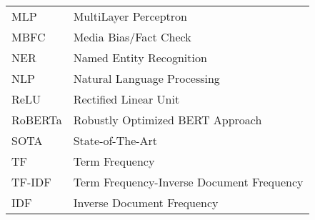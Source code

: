 \documentclass[master=mai,masteroption=slt]{kulemt}
\begin{document}
\begin{flushleft}
\begin{tabularx}{\textwidth}{@{}p{30mm}X@{}}
        MLP        & MultiLayer Perceptron                                                                       \\
        MBFC       & Media Bias/Fact Check                                                                       \\
        NER        & Named Entity Recognition                                                                    \\
        NLP        & Natural Language Processing                                                                 \\
        ReLU       & Rectified Linear Unit                                                                       \\
        RoBERTa    & Robustly Optimized BERT Approach                                                            \\
        SOTA       & State-of-The-Art                                                                            \\
        TF         & Term Frequency                                                                              \\
        TF-IDF     & Term Frequency-Inverse Document Frequency                                                   \\
        IDF        & Inverse Document Frequency                                                                  \\
    \end{tabularx}
\end{flushleft}
\end{document}

